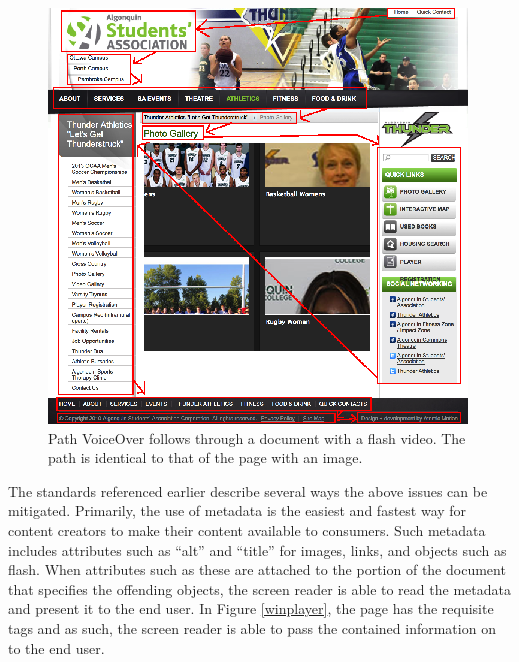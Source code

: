 \documentclass[]{article}
\begin{document}
\begin{figure}[htbp]
\centering
\includegraphics{alg_gal_vo_path.png}
\caption{Path VoiceOver follows through a document with a flash video.
The path is identical to that of the page with an image.
\label{flashgal}}
\end{figure}

The standards referenced earlier describe several ways the above issues
can be mitigated. Primarily, the use of metadata is the easiest and
fastest way for content creators to make their content available to
consumers. Such metadata includes attributes such as ``alt'' and
``title'' for images, links, and objects such as flash. When attributes
such as these are attached to the portion of the document that specifies
the offending objects, the screen reader is able to read the metadata
and present it to the end user. In Figure \ref{winplayer}, the page has
the requisite tags and as such, the screen reader is able to pass the
contained information on to the end user.
\end{document}
